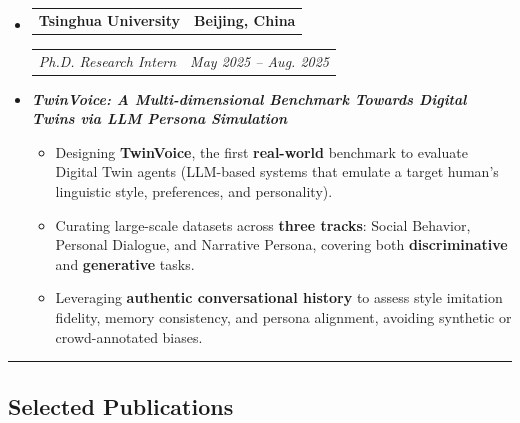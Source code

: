 \documentclass[11pt,letterpaper]{article}
\makeatletter
\newcommand{\headerrow}[2]
{\begin{tabular*}{\linewidth}{l@{\extracolsep{\fill}}r}
#1 & #2 \\
\end{tabular*}}
\makeatother
\begin{document}
\begin{itemize}[leftmargin=1em]
    \item
    \headerrow
        {\textbf{Tsinghua University}}
        {\textbf{Beijing, China}}
    \headerrow
        {\emph{Ph.D. Research Intern}}
        {\emph{May 2025 -- Aug. 2025}}

    \item \emph{\textbf{TwinVoice: A Multi-dimensional Benchmark Towards Digital Twins via LLM Persona Simulation}}
    \begin{itemize}[leftmargin=1.3em,itemsep=0.05em,topsep=0.15em]
        \item Designing \textbf{TwinVoice}, the first \textbf{real-world} benchmark to evaluate Digital Twin agents (LLM-based systems that emulate a target human’s linguistic style, preferences, and personality).
        \item Curating large-scale datasets across \textbf{three tracks}: Social Behavior, Personal Dialogue, and Narrative Persona, covering both \textbf{discriminative} and \textbf{generative} tasks.
        \item Leveraging \textbf{authentic conversational history} to assess style imitation fidelity, memory consistency, and persona alignment, avoiding synthetic or crowd-annotated biases.
    \end{itemize}

\end{itemize}

\hrule
\vspace{-1em}
\subsection*{\Large Selected Publications}
\end{document}
